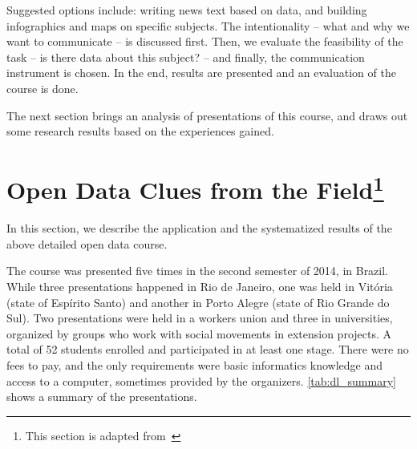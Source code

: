 Suggested options include: writing news text based on data, and building infographics and maps on specific subjects. The intentionality – what and why we want to communicate – is discussed first. Then, we evaluate the feasibility of the task – is there data about this subject? – and finally, the communication instrument is chosen. In the end, results are presented and an evaluation of the course is done.

The next section brings an analysis of presentations of this course, and draws out some research results based on the experiences gained.

\section[Open Data Clues from the Field]{Open Data Clues from the Field\footnote{This section is adapted from~}}

\label{dl_results} 

In this section, we describe the application and the systematized results of the above detailed open data course.

The course was presented five times in the second semester of 2014, in Brazil. While three presentations happened in Rio de Janeiro, one was held in Vitória (state of Espírito Santo) and another in Porto Alegre (state of Rio Grande do Sul). Two presentations were held in a workers union and three in universities, organized by groups who work with social movements in extension projects. A total of 52 students enrolled and participated in at least one stage. There were no fees to pay, and the only requirements were basic informatics knowledge and access to a computer, sometimes provided by the organizers. \autoref{tab:dl_summary} shows a summary of the presentations.


